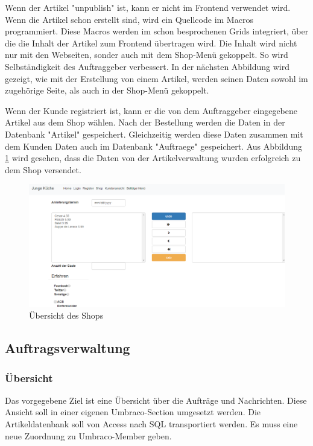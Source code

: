 Wenn der Artikel "unpublish" ist, kann er nicht im Frontend verwendet wird. Wenn die Artikel schon erstellt sind, wird ein Quellcode im Macros programmiert. Diese Macros werden im schon besprochenen Grids integriert, über die die Inhalt der Artikel zum Frontend übertragen wird. 
Die Inhalt wird nicht nur mit den Webseiten, sonder auch mit dem Shop-Menü gekoppelt. So wird Selbständigkeit des Auftraggeber verbessert. In der nächsten Abbildung wird gezeigt, wie mit der Erstellung von einem Artikel, werden seinen Daten sowohl im zugehörige Seite, als auch in der Shop-Menü gekoppelt.
 
Wenn der Kunde registriert ist, kann er die von dem Auftraggeber eingegebene Artikel aus dem Shop wählen. Nach der Bestellung werden die Daten in der Datenbank "Artikel" gespeichert. Gleichzeitig werden diese Daten zusammen mit dem Kunden Daten auch im Datenbank "Auftraege" gespeichert. Aus Abbildung \ref{fig:Shop} wird gesehen, dass die Daten von der Artikelverwaltung wurden erfolgreich zu dem Shop versendet.

\begin{figure}[h]
	\centering
	\includegraphics[width=1\linewidth]{Graphics/shop.png}
	\caption[Shop]{Übersicht des Shops}
	\label{fig:Shop}
\end{figure}


\subsection{Auftragsverwaltung}

\subsubsection{Übersicht}

Das vorgegebene Ziel ist eine Übersicht über die Aufträge und Nachrichten. Diese Ansicht soll in einer eigenen Umbraco-Section umgesetzt werden. Die Artikeldatenbank soll von Access nach SQL transportiert werden. Es muss eine neue Zuordnung zu Umbraco-Member geben.

